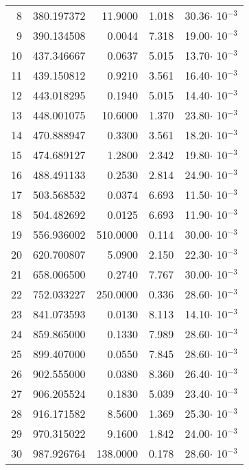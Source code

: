 {\begin{longtable}{rrrrr}
8     &   380.197372&   11.9000&  1.018&   30.36$\cdot$ 10$^{-3}$\\
9     &   390.134508&    0.0044&  7.318&   19.00$\cdot$ 10$^{-3}$\\
10    &   437.346667&    0.0637&  5.015&   13.70$\cdot$ 10$^{-3}$\\
11    &   439.150812&    0.9210&  3.561&   16.40$\cdot$ 10$^{-3}$\\
12    &   443.018295&    0.1940&  5.015&   14.40$\cdot$ 10$^{-3}$\\
13    &   448.001075&   10.6000&  1.370&   23.80$\cdot$ 10$^{-3}$\\
14    &   470.888947&    0.3300&  3.561&   18.20$\cdot$ 10$^{-3}$\\
15    &   474.689127&    1.2800&  2.342&   19.80$\cdot$ 10$^{-3}$\\
16    &   488.491133&    0.2530&  2.814&   24.90$\cdot$ 10$^{-3}$\\
17    &   503.568532&    0.0374&  6.693&   11.50$\cdot$ 10$^{-3}$\\
18    &   504.482692&    0.0125&  6.693&   11.90$\cdot$ 10$^{-3}$\\
19    &   556.936002&  510.0000&  0.114&   30.00$\cdot$ 10$^{-3}$\\
20    &   620.700807&    5.0900&  2.150&   22.30$\cdot$ 10$^{-3}$\\
21    &   658.006500&    0.2740&  7.767&   30.00$\cdot$ 10$^{-3}$\\
22    &   752.033227&  250.0000&  0.336&   28.60$\cdot$ 10$^{-3}$\\
23    &   841.073593&    0.0130&  8.113&   14.10$\cdot$ 10$^{-3}$\\
24    &   859.865000&    0.1330&  7.989&   28.60$\cdot$ 10$^{-3}$\\
25    &   899.407000&    0.0550&  7.845&   28.60$\cdot$ 10$^{-3}$\\
26    &   902.555000&    0.0380&  8.360&   26.40$\cdot$ 10$^{-3}$\\
27    &   906.205524&    0.1830&  5.039&   23.40$\cdot$ 10$^{-3}$\\
28    &   916.171582&    8.5600&  1.369&   25.30$\cdot$ 10$^{-3}$\\
29    &   970.315022&    9.1600&  1.842&   24.00$\cdot$ 10$^{-3}$\\
30    &   987.926764&  138.0000&  0.178&   28.60$\cdot$ 10$^{-3}$\\
\hline
\end{longtable}


}
